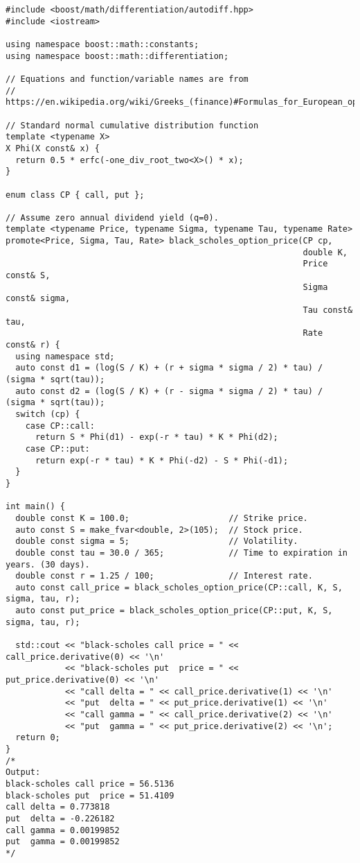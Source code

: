 \documentclass{article}
\begin{document}
\begin{verbatim}
#include <boost/math/differentiation/autodiff.hpp>
#include <iostream>

using namespace boost::math::constants;
using namespace boost::math::differentiation;

// Equations and function/variable names are from
// https://en.wikipedia.org/wiki/Greeks_(finance)#Formulas_for_European_option_Greeks

// Standard normal cumulative distribution function
template <typename X>
X Phi(X const& x) {
  return 0.5 * erfc(-one_div_root_two<X>() * x);
}

enum class CP { call, put };

// Assume zero annual dividend yield (q=0).
template <typename Price, typename Sigma, typename Tau, typename Rate>
promote<Price, Sigma, Tau, Rate> black_scholes_option_price(CP cp,
                                                            double K,
                                                            Price const& S,
                                                            Sigma const& sigma,
                                                            Tau const& tau,
                                                            Rate const& r) {
  using namespace std;
  auto const d1 = (log(S / K) + (r + sigma * sigma / 2) * tau) / (sigma * sqrt(tau));
  auto const d2 = (log(S / K) + (r - sigma * sigma / 2) * tau) / (sigma * sqrt(tau));
  switch (cp) {
    case CP::call:
      return S * Phi(d1) - exp(-r * tau) * K * Phi(d2);
    case CP::put:
      return exp(-r * tau) * K * Phi(-d2) - S * Phi(-d1);
  }
}

int main() {
  double const K = 100.0;                    // Strike price.
  auto const S = make_fvar<double, 2>(105);  // Stock price.
  double const sigma = 5;                    // Volatility.
  double const tau = 30.0 / 365;             // Time to expiration in years. (30 days).
  double const r = 1.25 / 100;               // Interest rate.
  auto const call_price = black_scholes_option_price(CP::call, K, S, sigma, tau, r);
  auto const put_price = black_scholes_option_price(CP::put, K, S, sigma, tau, r);

  std::cout << "black-scholes call price = " << call_price.derivative(0) << '\n'
            << "black-scholes put  price = " << put_price.derivative(0) << '\n'
            << "call delta = " << call_price.derivative(1) << '\n'
            << "put  delta = " << put_price.derivative(1) << '\n'
            << "call gamma = " << call_price.derivative(2) << '\n'
            << "put  gamma = " << put_price.derivative(2) << '\n';
  return 0;
}
/*
Output:
black-scholes call price = 56.5136
black-scholes put  price = 51.4109
call delta = 0.773818
put  delta = -0.226182
call gamma = 0.00199852
put  gamma = 0.00199852
*/
\end{verbatim}
\end{document}
